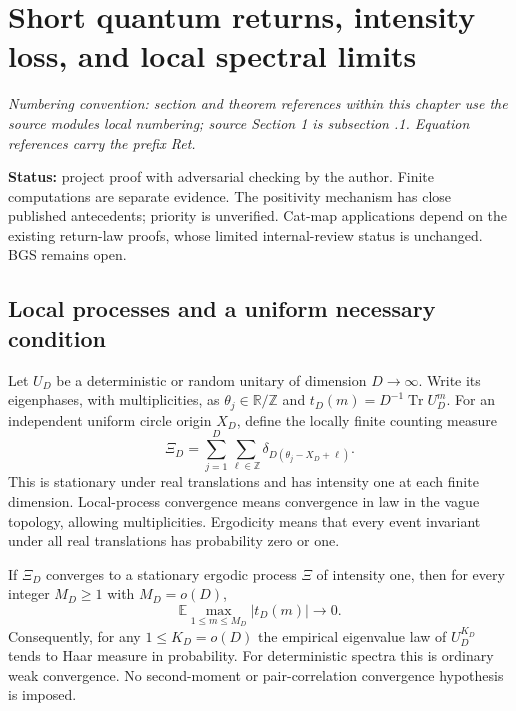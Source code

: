 \hypertarget{short-quantum-returns-intensity-loss-and-local-spectral-limits}{%
\section{Short quantum returns, intensity loss, and local spectral limits}\label{short-quantum-returns-intensity-loss-and-local-spectral-limits}}
\par\smallskip\noindent\emph{Numbering convention: section and theorem references within this chapter use the source module\textquotesingle s local numbering; source Section 1 is subsection \thesection.1. Equation references carry the prefix Ret.}\par\smallskip

\textbf{Status:} project proof with adversarial checking by the author. Finite computations are
separate evidence. The positivity mechanism has close published antecedents;
priority is unverified. Cat-map applications depend on the existing return-law
proofs, whose limited internal-review status is unchanged. BGS remains open.

\hypertarget{local-processes-and-a-uniform-necessary-condition}{%
\subsection{Local processes and a uniform necessary condition}\label{local-processes-and-a-uniform-necessary-condition}}

Let \(U_D\) be a deterministic or random unitary of dimension \(D\to\infty\).
Write its eigenphases, with multiplicities, as \(\theta_j\in\mathbb R/\mathbb Z\)
and \(t_D(m)=D^{-1}\operatorname{Tr}U_D^m\).
For an independent uniform circle origin \(X_D\), define the locally finite
counting measure
\[
 \Xi_D=\sum_{j=1}^D\sum_{\ell\in\mathbb Z}
                    \delta_{D(\theta_j-X_D+\ell)}.                 \tag{Ret.S1}
\]
This is stationary under real translations and has intensity one at each
finite dimension. Local-process convergence means convergence in law in the
vague topology, allowing multiplicities. Ergodicity means that every event
invariant under all real translations has probability zero or one.

\begin{theorem}\label{pass1:return_obstruction-1} If \(\Xi_D\) converges to a stationary ergodic process \(\Xi\) of
intensity one, then for every integer \(M_D\ge1\) with \(M_D=o(D)\),
\[
             \mathbb E\max_{1\le m\le M_D}|t_D(m)|\longrightarrow0. \tag{Ret.S2}
\]
Consequently, for any \(1\le K_D=o(D)\) the empirical eigenvalue law of
\(U_D^{K_D}\) tends to Haar measure in probability. For deterministic spectra
this is ordinary weak convergence. No second-moment or pair-correlation
convergence hypothesis is imposed.
\end{theorem}

